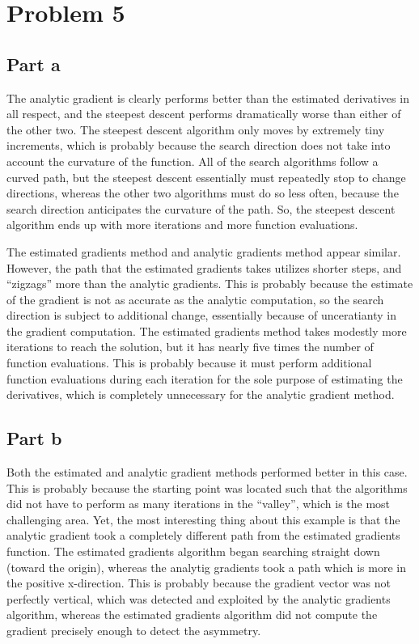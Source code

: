 \documentclass[twoside]{report} %
\begin{document}
\section{Problem 5}
\subsection{Part a}
The analytic gradient is clearly performs better than the estimated derivatives in all respect, and the steepest descent performs
dramatically worse than either of the other two. The steepest descent algorithm only moves by extremely tiny increments, which is
probably because the search direction does not take into account the curvature of the function. All of the search algorithms follow
a curved path, but the steepest descent essentially must repeatedly stop to change directions, whereas the other two algorithms
must do so less often, because the search direction anticipates the curvature of the path. So, the steepest descent algorithm
ends up with more
iterations and more function evaluations.

The estimated gradients method and analytic gradients method appear similar. However, the path that the estimated gradients takes
utilizes shorter steps, and ``zigzags'' more than the analytic gradients. This is probably because the estimate of the gradient
is not as accurate as the analytic computation, so the search direction is subject to additional change, essentially because
of unceratianty in the gradient computation. The estimated gradients method takes modestly more iterations to reach the solution,
but it has nearly five times the number of function evaluations. This is probably because it must perform additional function
evaluations during each iteration for the sole purpose of estimating the derivatives, which is completely unnecessary for the
analytic gradient method.

\subsection{Part b}
Both the estimated and analytic gradient methods performed better in this case. This is probably because the starting point
was located such that the algorithms did not have to perform as many iterations in the ``valley'', which is the most challenging
area. Yet, the most interesting thing about this example is that the analytic gradient took a completely different path
from the estimated gradients function. The estimated gradients algorithm began searching straight down (toward the origin),
whereas the analytig gradients took a path which is more in the positive x-direction. This is probably because the gradient vector was
not perfectly vertical, which was detected and exploited by the analytic gradients algorithm, whereas the estimated gradients
algorithm did not compute the gradient precisely enough to detect the asymmetry.
\end{document}
